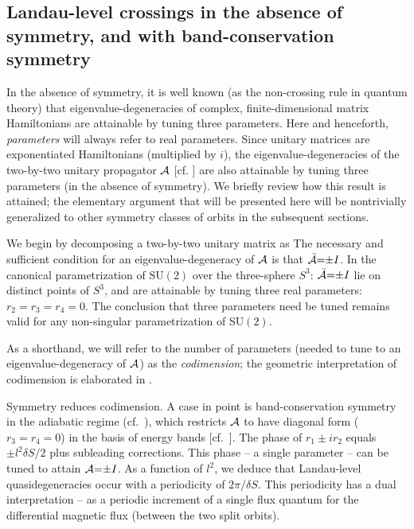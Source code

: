 \documentclass[aps, showpacs, twocolumn, notitlepage, superscriptaddress]{revtex4-1}
\begin{document}
\subsection{Landau-level crossings in the absence of symmetry, and with band-conservation symmetry}\label{sec:introducecodimension}


In the absence of symmetry,  it is well known (as the non-crossing rule in quantum theory\cite{neumann2000behaviour}) that eigenvalue-degeneracies of complex, finite-dimensional matrix Hamiltonians are attainable by tuning three parameters. Here and henceforth,   \textit{parameters}  will always refer to real parameters. Since unitary matrices are exponentiated Hamiltonians (multiplied by $i$), the eigenvalue-degeneracies of the two-by-two unitary propagator ${\cal A}$ [cf. ] are also attainable by tuning three parameters (in the absence of symmetry)\cite{haake2010quantum}. We briefly review how this  result is attained; the elementary argument that will be presented here will be nontrivially generalized to other symmetry classes of orbits in the subsequent sections. 


We begin by decomposing a two-by-two unitary  matrix as  The necessary and sufficient condition for an eigenvalue-degeneracy of ${\cal A}$ is that ${\cal \bar{A}}{=}{\pm}I$. In the canonical parametrization of $\text{SU}(2)$ over the three-sphere $S^3$: 
${\cal \bar{A}}{=}{\pm}I$ lie on distinct points of $S^3$, and are attainable by tuning three real parameters: $r_2{=}r_3{=}r_4{=}0$. The conclusion that three parameters need be tuned remains valid for any  non-singular parametrization of SU$(2)$. 

As a shorthand, we will refer to the number of parameters (needed to tune to an eigenvalue-degeneracy of ${\cal A}$) as the \textit{codimension}; the geometric interpretation of codimension is elaborated in .

Symmetry reduces codimension. A case in point is band-conservation symmetry in the adiabatic regime (cf.\ ), which restricts ${\cal A}$ to have diagonal form  ($r_3{=}r_4{=}0$) in the basis of energy bands [cf.\ ]. The phase of $r_1{\pm}ir_2$ equals ${\pm} l^2\delta S/2$ plus subleading corrections. This  phase -- a single parameter --  can be  tuned to attain ${\cal A}{=}{\pm}I$. As a function of $l^2$, we deduce that Landau-level quasidegeneracies occur with a periodicity of $2\pi/\delta S$. This periodicity  has a dual interpretation -- as a periodic increment of a single flux quantum for the differential magnetic flux (between the two split orbits).
\end{document}
